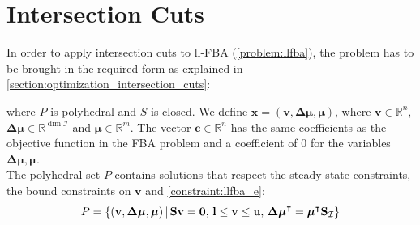 \section{Intersection Cuts} \label{section:methods_interscetion_cuts}
In order to apply intersection cuts to \textsf{ll-FBA} (\cref{problem:llfba}), the problem has to be brought in the required form as explained in \cref{section:optimization_intersection_cuts}:
 where $P$ is polyhedral and $S$ is closed.
We define $\mathbf x = (\mathbf v, \boldsymbol{\Delta \mu}, \boldsymbol\mu)$, where $\mathbf v \in \mathbb{R}^n$, $\boldsymbol{\Delta \mu} \in \mathbb{R}^{\dim\mathcal{I}}$ and $\boldsymbol \mu \in \mathbb{R}^m$. The vector $\mathbf c \in \mathbb{R}^n$ has the same coefficients as the objective function in the \textsf{FBA} problem and a coefficient of $0$ for the variables $\boldsymbol{\Delta \mu}, \boldsymbol \mu$. \\ 
The polyhedral set $P$ contains solutions that respect the steady-state constraints, the bound constraints on $\mathbf v$ and \cref{constraint:llfba_e}:
\begin{equation*}
    \centering
    P = \{(\mathbf v, \boldsymbol{\Delta \mu}, \boldsymbol\mu) \, | \, \mathbf S \mathbf v= \mathbf 0, \, \mathbf l \leq \mathbf v \leq \mathbf u, \, \boldsymbol{\Delta \mu}^\intercal = \boldsymbol \mu^\intercal \mathbf S_{\mathcal{I}}\}
\end{equation*}

